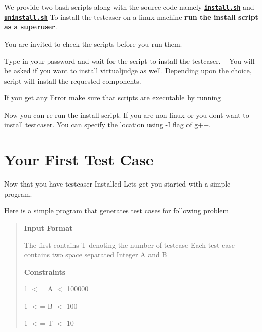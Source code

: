 We provide two bash scripts along with the source code namely \href{https://github.com/coder3101/testcaser/blob/master/install.sh}{\texttt{ {\bfseries{install.\+sh}}}} and \href{https://github.com/coder3101/testcaser/blob/master/uninstall.sh}{\texttt{ {\bfseries{uninstall.\+sh}}}} To install the testcaser on a linux machine {\bfseries{run the install script as a superuser}}.

You are invited to check the scripts before you run them.


\begin{DoxyCode}{0}
\end{DoxyCode}


Type in your password and wait for the script to install the testcaser. ~\newline
 You will be asked if you want to install {\ttfamily virtualjudge} as well. Depending upon the choice, script will install the requested components.

If you get any Error make sure that scripts are executable by running 
\begin{DoxyCode}{0}
\end{DoxyCode}


Now you can re-\/run the install script. If you are non-\/linux or you don\textquotesingle{}t want to install testcaser. You can specify the location using {\ttfamily -\/I} flag of {\ttfamily g++}.

\DoxyHorRuler
\hypertarget{index_started}{}\section{Your First Test Case}\label{index_started}
Now that you have testcaser Installed Let\textquotesingle{}s get you started with a simple program.

Here is a simple program that generates test cases for following problem \begin{quote}
{\bfseries{Input Format}}

The first contains T denoting the number of testcase Each test case contains two space separated Integer A and B

{\bfseries{Constraints}}

1 $<$= A $<$ 100000

1 $<$= B $<$ 100

1 $<$= T $<$ 10 \end{quote}




